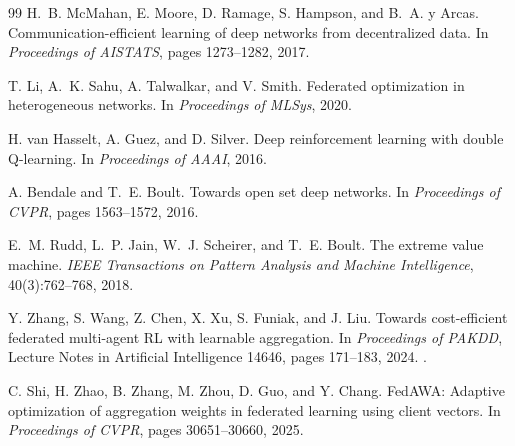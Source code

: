 \documentclass[10pt,twocolumn]{article}
\begin{document}
\begin{thebibliography}{99}
H.~B. McMahan, E. Moore, D. Ramage, S. Hampson, and B.~A. y Arcas.
\newblock Communication-efficient learning of deep networks from decentralized data.
\newblock In \emph{Proceedings of AISTATS}, pages 1273--1282, 2017.

T. Li, A.~K. Sahu, A. Talwalkar, and V. Smith.
\newblock Federated optimization in heterogeneous networks.
\newblock In \emph{Proceedings of MLSys}, 2020.

H. van Hasselt, A. Guez, and D. Silver.
\newblock Deep reinforcement learning with double Q-learning.
\newblock In \emph{Proceedings of AAAI}, 2016.

A. Bendale and T.~E. Boult.
\newblock Towards open set deep networks.
\newblock In \emph{Proceedings of CVPR}, pages 1563--1572, 2016.

E.~M. Rudd, L.~P. Jain, W.~J. Scheirer, and T.~E. Boult.
\newblock The extreme value machine.
\newblock \emph{IEEE Transactions on Pattern Analysis and Machine Intelligence}, 40(3):762--768, 2018.

Y. Zhang, S. Wang, Z. Chen, X. Xu, S. Funiak, and J. Liu.
\newblock Towards cost-efficient federated multi-agent RL with learnable aggregation.
\newblock In \emph{Proceedings of PAKDD}, Lecture Notes in Artificial Intelligence 14646, pages 171--183, 2024.
\newblock {}.

C. Shi, H. Zhao, B. Zhang, M. Zhou, D. Guo, and Y. Chang.
\newblock FedAWA: Adaptive optimization of aggregation weights in federated learning using client vectors.
\newblock In \emph{Proceedings of CVPR}, pages 30651--30660, 2025.
\end{thebibliography}
\end{document}
